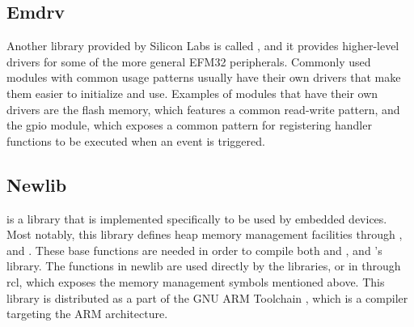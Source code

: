 \subsection{Emdrv}

Another library provided by Silicon Labs is called {\emdrv}, and it provides higher-level drivers for some of the more general EFM32 peripherals.
Commonly used modules with common usage patterns usually have their own drivers that make them easier to initialize and use.
Examples of modules that have their own drivers are the flash memory, which features a common read-write pattern, and the \gls{gpio} module, which exposes a common pattern for registering handler functions to be executed when an event is triggered.

\subsection{Newlib}

{\newlib} is a {\C} library that is implemented specifically to be used by embedded devices.
Most notably, this library defines heap memory management facilities through ,  and .
These base functions are needed in order to compile both {\emlib} and {\emdrv}, and {\rust}'s  library.
The functions in newlib are used directly by the {\C} libraries, or in {\rust} through \gls{rcl}, which exposes the memory management symbols mentioned above.
This library is distributed as a part of the GNU ARM Toolchain \cite{web:arm_toolchain}, which is a {\C} compiler targeting the ARM architecture.
